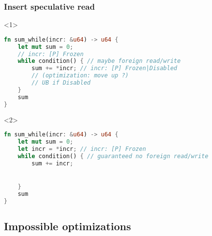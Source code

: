 \begin{frame}[fragile, t]
    \frametitle{{\cmark} Insert speculative read}
    \begin{onlyenv}<1>
        \begin{block}{}
            \begin{lstlisting}[language=rust]
fn sum_while(incr: &u64) -> u64 {
    let mut sum = 0;
    // incr: [P] Frozen
    while condition() { // maybe foreign read/write
        sum += *incr; // incr: [P] Frozen|Disabled
        // (optimization: move up ?)
        // UB if Disabled
    }
    sum
}
            \end{lstlisting}
        \end{block}
    \end{onlyenv}

    \begin{onlyenv}<2>
        \begin{block}{}
            \begin{lstlisting}[language=rust]
fn sum_while(incr: &u64) -> u64 {
    let mut sum = 0;
    let incr = *incr; // incr: [P] Frozen
    while condition() { // guaranteed no foreign read/write
        sum += incr;


    }
    sum
}
            \end{lstlisting}
        \end{block}
    \end{onlyenv}
\end{frame}

\subsection{Impossible optimizations}

